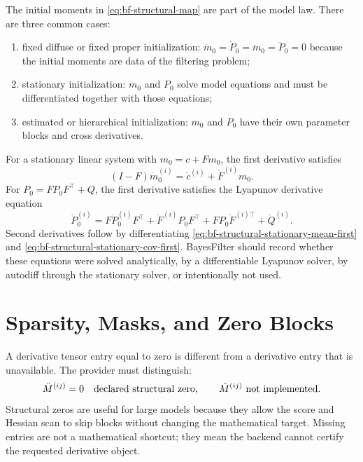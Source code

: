 The initial moments in \eqref{eq:bf-structural-map} are part of the model law.
There are three common cases:
\begin{enumerate}[label=(\roman*)]
  \item fixed diffuse or fixed proper initialization:
    $\dot m_0=\dot P_0=\ddot m_0=\ddot P_0=0$ because the initial moments are
    data of the filtering problem;
  \item stationary initialization:
    $m_0$ and $P_0$ solve model equations and must be differentiated together
    with those equations;
  \item estimated or hierarchical initialization:
    $m_0$ and $P_0$ have their own parameter blocks and cross derivatives.
\end{enumerate}
For a stationary linear system with $m_0=c+Fm_0$, the first derivative satisfies
\begin{equation}
\label{eq:bf-structural-stationary-mean-first}
  (I-F)\dot m_0^{(i)}
  =
  \dot c^{(i)}+\dot F^{(i)}m_0.
\end{equation}
For $P_0=FP_0F^\top+Q$, the first derivative satisfies the Lyapunov derivative
equation
\begin{equation}
\label{eq:bf-structural-stationary-cov-first}
  \dot P_0^{(i)}
  =
  F\dot P_0^{(i)}F^\top
  +\dot F^{(i)}P_0F^\top
  +FP_0\dot F^{(i)\top}
  +\dot Q^{(i)}.
\end{equation}
Second derivatives follow by differentiating
\eqref{eq:bf-structural-stationary-mean-first} and
\eqref{eq:bf-structural-stationary-cov-first}.  BayesFilter should record
whether these equations were solved analytically, by a differentiable Lyapunov
solver, by autodiff through the stationary solver, or intentionally not used.

\section{Sparsity, Masks, and Zero Blocks}
\label{sec:bf-structural-sparsity-masks}

A derivative tensor entry equal to zero is different from a derivative entry
that is unavailable.  The provider must distinguish:
\[
  \ddot M^{(ij)}=0\quad\hbox{declared structural zero},
  \qquad
  \ddot M^{(ij)}\ \hbox{not implemented}.
\]
Structural zeros are useful for large models because they allow the score and
Hessian scan to skip blocks without changing the mathematical target.  Missing
entries are not a mathematical shortcut; they mean the backend cannot certify
the requested derivative object.

